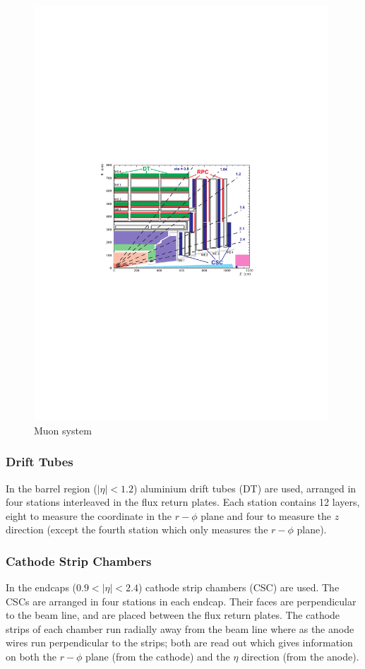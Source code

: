 \begin{figure}[htbp]
  \centering
  \includegraphics[width=0.98\textwidth]{muon_system}
  \caption{Muon system}
  \label{fig:muon_system}
\end{figure}

\subsubsection{Drift Tubes}
In the barrel region ($|\eta| < 1.2$) aluminium drift tubes (DT) are used,
arranged in four stations interleaved in the flux return
plates. 
Each station contains 12 layers, eight to measure the coordinate in the
$r-\phi$ plane and four to measure the $z$ direction (except the fourth station
which only measures the $r-\phi$ plane). 

\subsubsection{Cathode Strip Chambers}
In the endcaps ($0.9<|\eta|<2.4$) cathode strip chambers (CSC) are used. The
CSCs are arranged in four stations in each endcap. Their faces are perpendicular
to the beam line, and are placed between the flux return plates.  The cathode
strips of each chamber run radially away from the beam line where as the anode
wires run perpendicular to the strips; both are read out which gives information
on both the $r-\phi$ plane (from the cathode) and the $\eta$ direction (from the
anode). \cite{cms}

